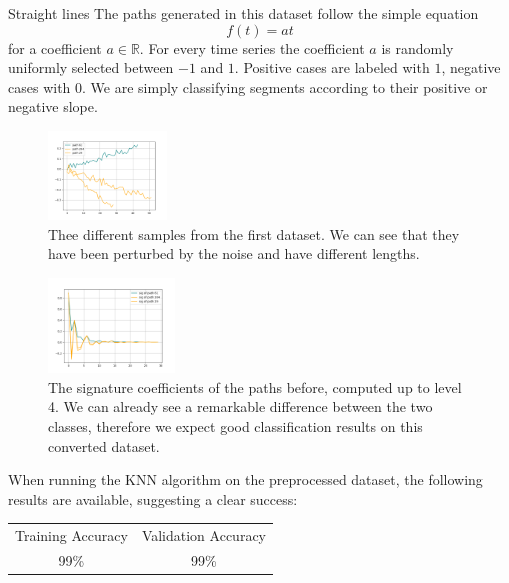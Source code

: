 \documentclass[twocolumn,9pt]{article}
\theoremstyle{definition}
\theoremstyle{remark}
\begin{document}
\begin{section}{Straight lines}
The paths generated in this dataset follow the simple equation
\begin{equation}
	f(t) = at
\end{equation}
for a coefficient $a \in \mathbb{R}$. For every time series
the coefficient $a$ is randomly uniformly selected between $-1$ and
$1$. Positive cases are labeled with $1$, negative cases with $0$.
We are simply classifying segments according to their
positive or negative slope.

\begin{figure}[H]
\center
\includegraphics[width=0.28\textwidth]{proposed_plots/SEG-paths-seed0.png}
\caption{
Thee different samples from the first dataset.
We can see that they have been perturbed by the noise
and have different lengths.
}
\end{figure}

\begin{figure}[H]
\center
\includegraphics[width=0.30\textwidth]{proposed_plots/SEG-signatures-seed0.png}
\caption{
The signature coefficients of the paths before,
computed up to level 4.
We can already see a remarkable difference between the two classes,
therefore we expect good classification results on this converted dataset.
}
\end{figure}

When running the KNN algorithm on the preprocessed dataset, the following
results are available, suggesting a clear success:

\begin{tabular}{ |c|c| }
\hline
Training Accuracy & Validation Accuracy \\
99\%	& 99\%	\\
\hline
\end{tabular}


\end{section}
\end{document}
